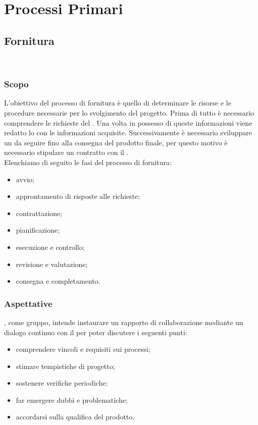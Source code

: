 \section{Processi Primari}
\subsection{Fornitura}\
\subsubsection{Scopo}
L'obiettivo del processo di fornitura è quello di determinare le risorse e le procedure necessarie per lo svolgimento del progetto. 
Prima di tutto è necessario comprendere le richieste del \proponProg{}. Una volta in possesso di queste informazioni viene redatto lo \SdFv{} con le informazioni acquisite.
Successivamente è necessario sviluppare un \PdPv{} da seguire fino alla consegna del prodotto finale, per questo motivo è necessario stipulare un contratto con il \proponProg{}.\\
Elenchiamo di seguito le fasi del processo di fornitura:
\begin{itemize}
    \item{avvio;}
    \item{approntamento di risposte alle richieste;}
    \item{contrattazione;}
    \item{pianificazione;}
    \item{esecuzione e controllo;}
    \item{revisione e valutazione;}
    \item{consegna e completamento.}
\end{itemize}

\subsubsection{Aspettative}
\Omicron, come gruppo, intende instaurare un rapporto di collaborazione mediante un dialogo continuo con il \proponProg{} per poter discutere i seguenti punti:
\begin{itemize}
    \item{comprendere vincoli e requisiti sui processi;}
    \item{stimare tempistiche di progetto;}
    \item{sostenere verifiche periodiche;}
    \item{far emergere dubbi e problematiche;}
    \item{accordarsi sulla qualifica del prodotto.}
\end{itemize}

